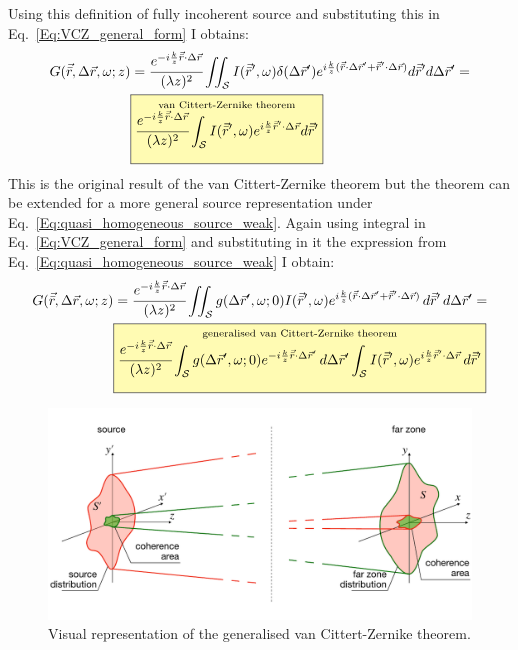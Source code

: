     Using this definition of fully incoherent source and substituting this in Eq.~\ref{Eq:VCZ_general_form} I obtains:
    \begin{align}
        G(\vec{\bar{r}}, \Delta\vec{r}, \omega; z) &= \cfrac{e^{- i \frac{k}{z} \vec{\bar{r}}\cdot\Delta\vec{r}}}{(\lambda z)^2} \iint_{\mathcal{S}} I(\vec{\bar{r}}', \omega)\delta(\Delta \vec{r}') e^{i \frac{k}{z} (\vec{\bar{r}}\cdot\Delta\vec{r}' + \vec{\bar{r}}'\cdot\Delta\vec{r})} d\vec{\bar{r}}' d\Delta\vec{r}' \nonumber = \\
        &\fcolorbox{black}{yellow!30}{\rule[-4ex]{0pt}{10ex}$\displaystyle \stackrel{\text{van Cittert-Zernike theorem}}{\cfrac{e^{-i \frac{k}{z} \vec{\bar{r}}\cdot\Delta\vec{r}}}{(\lambda z)^2} \int_{\mathcal{S}} I(\vec{\bar{r}}', \omega) e^{i \frac{k}{z} \vec{\bar{r}}'\cdot\Delta\vec{r}} d\vec{\bar{r}}'}$}
        \label{Eq:VCZ_incoherent}
    \end{align}
    This is the original result of the van Cittert-Zernike theorem but the theorem can be extended for a more general source representation under Eq.~\ref{Eq:quasi_homogeneous_source_weak}. Again using integral in Eq.~\ref{Eq:VCZ_general_form} and substituting in it the expression from Eq.~\ref{Eq:quasi_homogeneous_source_weak} I obtain:
    \begin{align}
        G(\vec{\bar{r}}, \Delta\vec{r}, \omega; z) &=  \cfrac{e^{-i \frac{k}{z} \vec{\bar{r}}\cdot\Delta\vec{r}}}{(\lambda z)^2} \iint_{\mathcal{S}} g(\Delta \vec{r}', \omega; 0)I(\vec{\bar{r}}', \omega) e^{i \frac{k}{z} (\vec{\bar{r}}\cdot\Delta\vec{r}' + \vec{\bar{r}}'\cdot\Delta\vec{r})} \, d\vec{\bar{r}}' \, d\Delta\vec{r}' \nonumber =\\
        &\fcolorbox{black}{yellow!30}{\rule[-4ex]{0pt}{10ex}$\displaystyle \stackrel{\text{generalised van Cittert-Zernike theorem}}{\cfrac{e^{-i \frac{k}{z} \vec{\bar{r}}\cdot\Delta\vec{r}}}{(\lambda z)^2} \int_{\mathcal{S}} g(\Delta \vec{r}', \omega; 0) e^{-i \frac{k}{z} \vec{\bar{r}}\cdot\Delta\vec{r}'} \, d\Delta\vec{r}'  \int_{\mathcal{S}} I(\vec{\bar{r}}', \omega) e^{i \frac{k}{z} \vec{\bar{r}}'\cdot\Delta\vec{r}} \, d\vec{\bar{r}}'}$}
        \label{Eq:VCZ_partially_coherent}
    \end{align}
    \begin{figure}[h!]
      \centering
      \includegraphics[width=0.95\linewidth]{content/images/Statistical_Optics/VCZ_scheme.pdf}
      \captionsetup{justification=centering}
      \caption{Visual representation of the generalised van Cittert-Zernike theorem. }
      \label{Fig:coh_prop_scheme}
    \end{figure}
